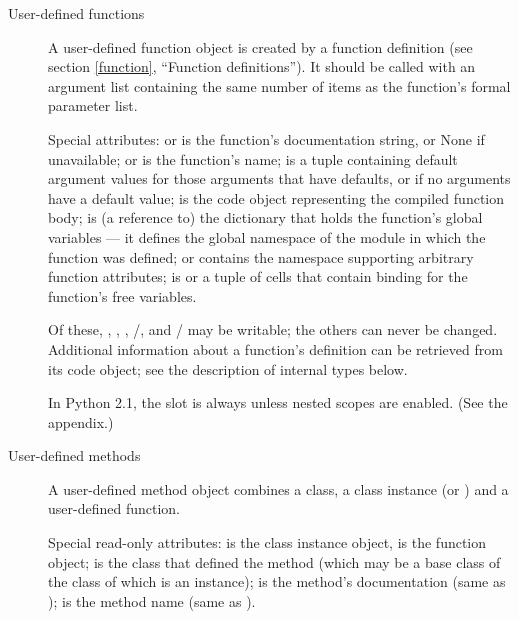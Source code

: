 \begin{description}
\begin{description}
\item[User-defined functions]
A user-defined function object is created by a function definition
(see section \ref{function}, ``Function definitions'').  It should be
called with an argument
list containing the same number of items as the function's formal
parameter list.

Special attributes:  or  is the
function's documentation string, or None if unavailable;
 or  is the function's name;
 is a tuple containing default argument values for
those arguments that have defaults, or  if no arguments
have a default value;  is the code object representing
the compiled function body;  is (a reference to)
the dictionary that holds the function's global variables --- it
defines the global namespace of the module in which the function was
defined;  or  contains the
namespace supporting arbitrary function attributes;
 is  or a tuple of cells that contain
binding for the function's free variables.

Of these, , , ,
/, and
/ may be writable; the
others can never be changed.  Additional information about a
function's definition can be retrieved from its code object; see the
description of internal types below.

In Python 2.1, the  slot is always 
unless nested scopes are enabled.  (See the appendix.)


\item[User-defined methods]
A user-defined method object combines a class, a class instance (or
) and a user-defined function.

Special read-only attributes:  is the class instance
object,  is the function object;
 is the class that defined the method (which may be a
base class of the class of which  is an instance);
 is the method's documentation (same as
);  is the method name (same as
).


\end{description}
\end{description}
